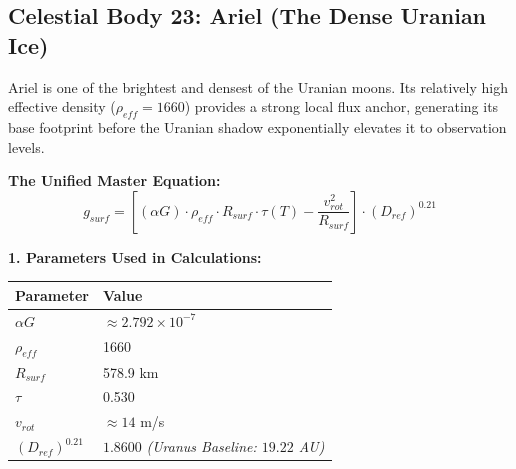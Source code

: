 \documentclass[11pt, a4paper]{article}
\begin{document}
\clearpage
\subsection{Celestial Body 23: Ariel (The Dense Uranian Ice)}
  Ariel is one of the brightest and densest of the Uranian moons. Its relatively high effective density ($\rho_{eff} = 1660$) provides a strong local flux anchor, generating its base footprint before the Uranian shadow exponentially elevates it to observation levels.

  \vspace{0.5em}
  \noindent \textbf{The Unified Master Equation:}
  $$ g_{surf} = \left[ (\alpha G) \cdot \rho_{eff} \cdot R_{surf} \cdot \tau(T) - \frac{v_{rot}^2}{R_{surf}} \right] \cdot (D_{ref})^{0.21} $$

  \vspace{0.5em}
  \noindent \textbf{1. Parameters Used in Calculations:} \\[0.5em]
  \begingroup
  \renewcommand{\arraystretch}{1.3}
  \hspace*{2em}
  \begin{tabular}{|l|l|}
    \hline
    \textbf{Parameter} & \textbf{Value} \\ \hline
    $\alpha G$ & $\approx 2.792 \times 10^{-7}$ \\ \hline
    $\rho_{eff}$ & 1660 \\ \hline
    $R_{surf}$ & 578.9 km \\ \hline
    $\tau$ & 0.530 \\ \hline
    $v_{rot}$ & $\approx 14$ m/s \\ \hline
    $(D_{ref})^{0.21}$ & $1.8600$ \textit{(Uranus Baseline: $19.22$ AU)} \\ \hline
  \end{tabular}
  \endgroup
\end{document}
